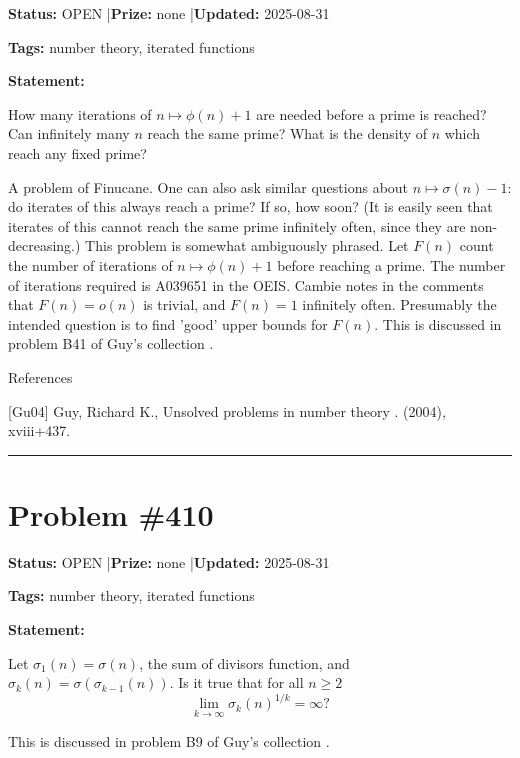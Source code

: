 \documentclass{article}
\begin{document}
\noindent\textbf{Status:} OPEN \quad|\quad \textbf{Prize:} none \quad|\quad \textbf{Updated:} 2025-08-31

\noindent\textbf{Tags:} number theory, iterated functions

\medskip

\noindent\textbf{Statement:}

How many iterations of $n\mapsto \phi(n)+1$ are needed before a prime is reached? Can infinitely many $n$ reach the same prime? What is the density of $n$ which reach any fixed prime?




A problem of Finucane. One can also ask similar questions about $n\mapsto \sigma(n)-1$: do iterates of this always reach a prime? If so, how soon? (It is easily seen that iterates of this cannot reach the same prime infinitely often, since they are non-decreasing.) This problem is somewhat ambiguously phrased. Let $F(n)$ count the number of iterations of $n\mapsto \phi(n)+1$ before reaching a prime. The number of iterations required is A039651 in the OEIS. Cambie notes in the comments that $F(n)=o(n)$ is trivial, and $F(n)=1$ infinitely often. Presumably the intended question is to find 'good' upper bounds for $F(n)$. This is discussed in problem B41 of Guy's collection \cite{Gu04}.




References

[Gu04] Guy, Richard K., Unsolved problems in number theory . (2004), xviii+437.

\noindent\rule{\linewidth}{0.4pt}


\section{Problem \#410}
\label{prob:410}

\noindent\textbf{Status:} OPEN \quad|\quad \textbf{Prize:} none \quad|\quad \textbf{Updated:} 2025-08-31

\noindent\textbf{Tags:} number theory, iterated functions

\medskip

\noindent\textbf{Statement:}

Let $\sigma_1(n)=\sigma(n)$, the sum of divisors function, and $\sigma_k(n)=\sigma(\sigma_{k-1}(n))$. Is it true that for all $n\geq 2$\[\lim_{k\to \infty} \sigma_k(n)^{1/k}=\infty?\]




This is discussed in problem B9 of Guy's collection \cite{Gu04}.
\end{document}
